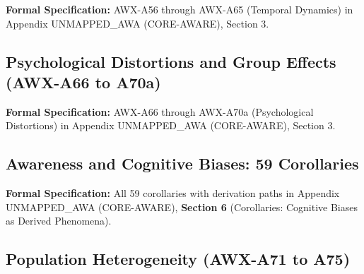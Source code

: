 

\begin{cross-reference}
\textbf{Formal Specification:} AWX-A56 through AWX-A65 (Temporal Dynamics) in
Appendix UNMAPPED_AWA (CORE-AWARE), Section 3.
\end{cross-reference}

\subsection{Psychological Distortions and Group Effects (AWX-A66 to A70a)}
\label{subsec:11-11-distortions}



\begin{cross-reference}
\textbf{Formal Specification:} AWX-A66 through AWX-A70a (Psychological Distortions) in
Appendix UNMAPPED_AWA (CORE-AWARE), Section 3.
\end{cross-reference}

\subsection{Awareness and Cognitive Biases: 59 Corollaries}
\label{subsec:11-12-biases}



\begin{cross-reference}
\textbf{Formal Specification:} All 59 corollaries with derivation paths in
Appendix UNMAPPED_AWA (CORE-AWARE), \textbf{Section 6} (Corollaries: Cognitive Biases as Derived Phenomena).
\end{cross-reference}

\subsection{Population Heterogeneity (AWX-A71 to A75)}
\label{subsec:11-13-heterogeneity}

